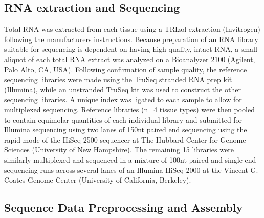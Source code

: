 \documentclass[11pt]{article}
\begin{document}
\subsection*{RNA extraction and Sequencing}

Total RNA was extracted from each tissue using a TRIzol extraction (Invitrogen) following the manufacturers instructions. Because preparation of an RNA library suitable for sequencing is dependent on having high
quality, intact RNA, a small aliquot of each total RNA extract was
analyzed on a Bioanalyzer 2100 (Agilent, Palo Alto, CA, USA).
Following confirmation of sample quality, the reference sequencing libraries
were made using the TruSeq stranded RNA prep kit
(Illumina), while an unstranded TruSeq kit was used to construct the other sequencing libraries. A unique index was ligated to each sample to allow for multiplexed sequencing. Reference libraries (n=4 tissue types) were then pooled to
contain equimolar quantities of each individual library and
submitted for Illumina sequencing using two lanes of 150nt paired end sequencing using the rapid-mode of the HiSeq 2500 sequencer at The Hubbard Center for Genome Sciences (University of New Hampshire). The remaining 15 libraries were similarly multiplexed and sequenced in a mixture of 100nt paired and single end sequencing runs across several lanes of an Illumina HiSeq 2000 at the Vincent G. Coates Genome Center (University of California, Berkeley).

\subsection*{Sequence Data Preprocessing and Assembly}
\end{document}
